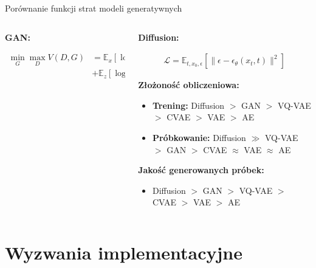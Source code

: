 \documentclass{beamer}
\begin{document}
\begin{frame}{Porównanie funkcji strat modeli generatywnych}
\begin{columns}
\begin{column}{0.3\textwidth}
    \textbf{GAN:}
    \vspace{-0.2cm}
    \begin{tcolorbox}[colback=yellow!10!white, colframe=black!60, boxrule=0.5pt, arc=3mm, boxsep=2pt, left=2pt, right=2pt]
    \begin{align*}
    \min_G \max_D V(D,G) &= \mathbb{E}_{x}[\log D(x)] \\
    &+ \mathbb{E}_{z}[\log(1 - D(G(z)))]
    \end{align*}
    \end{tcolorbox}
    \end{column}
    \begin{column}{0.4\textwidth}
    \textbf{Diffusion:}
    \vspace{-0.2cm}
    \begin{tcolorbox}[colback=yellow!10!white, colframe=black!60, boxrule=0.5pt, arc=3mm, boxsep=2pt, left=2pt, right=2pt]
    \begin{align*}
    \mathcal{L} = \mathbb{E}_{t,x_0,\epsilon} \left[ \|\epsilon - \epsilon_\theta(x_t, t)\|^2 \right]
    \end{align*}
    \end{tcolorbox}
    
    \medskip
    \textbf{Złożoność obliczeniowa:}
    \begin{itemize}
    \item \textbf{Trening:} Diffusion $>$ GAN $>$ VQ-VAE $>$ CVAE $>$ VAE $>$ AE
    \item \textbf{Próbkowanie:} Diffusion $\gg$ VQ-VAE $>$ GAN $>$ CVAE $\approx$ VAE $\approx$ AE
    \end{itemize}
    
    \textbf{Jakość generowanych próbek:}
    \begin{itemize}
    \item Diffusion $>$ GAN $>$ VQ-VAE $>$ CVAE $>$ VAE $>$ AE
    \end{itemize}
    \end{column}
  \end{columns}
\end{frame}


\section{Wyzwania implementacyjne}
\end{document}
